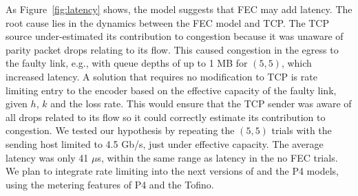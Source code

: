 As Figure~\ref{fig:latency} shows, the model suggests that FEC may add
latency. The root cause lies in the dynamics between the FEC model and TCP.
The TCP source under-estimated its contribution to congestion because it was
unaware of parity packet drops relating to its flow. This caused congestion in
the egress to the faulty link, e.g., with queue depths of up to 1 MB for
$(5,5)$, which increased latency. A solution that requires no modification to
TCP is rate limiting entry to the encoder based on the effective capacity of
the faulty link, given $h$, $k$ and the loss rate. This would ensure that the
TCP sender was aware of all drops related to its flow so it could correctly
estimate its contribution to congestion. We tested our hypothesis by repeating
the $(5, 5)$ trials with the sending host limited to 4.5 Gb/s, just under
effective capacity. The average latency was only 41 $\mu$s, within the same
range as latency in the no FEC trials. We plan to integrate rate limiting into
the next versions of \OurSys and the P4 models, using the metering features of
P4 and the Tofino.













